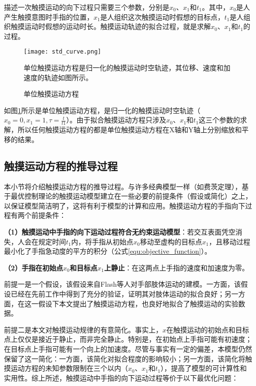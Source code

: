 描述一次触摸运动的向下过程只需要三个参数，分别是$x_0$、$x_1$和$t_1$。其中，$x_0$是人产生触摸意图时手指的位置，$x_1$是人组织这次触摸运动时假想的目标点，$t_1$是人组织触摸运动时假想的运动时长。触摸运动轨迹的拟合过程，就是求解$x_0$、$x_1$和$t_1$的过程。

\begin{figure}
	\centering
	\texttt{[image: std\_curve.png]}
	\caption*{单位触摸运动方程是归一化的触摸运动时空轨迹，其位移、速度和加速度的轨迹如图所示。}
	\caption{单位触摸运动方程}
	\label{fig:std_curve}
\end{figure}

如图\ref{fig:std_curve}所示是单位触摸运动方程，是归一化的触摸运动时空轨迹（$x_0=0,x_1=1,\tau=\frac{t}{t1}$）。由于拟合触摸运动方程只涉及$x_0$、$x_1$和$t_1$这三个参数的求解，所以任何触摸运动方程的都是单位触摸运动方程在X轴和Y轴上分别缩放和平移的结果。

\subsection{触摸运动方程的推导过程}

本小节将介绍触摸运动方程的推导过程。与许多经典模型一样（如费茨定理\cite{fitts1954information}），基于最优控制理论的触摸运动模型建立在一些必要的前提条件（假设或简化）之上，以保证模型简洁明了，这将有利于模型的计算和应用。触摸运动方程的手指向下过程有两个前提条件：

\textbf{（1）触摸运动中手指的向下运动过程符合无约束运动模型}：若交互表面凭空消失，人会在规定时间$t_1$内，将手指从初始点$x_0$移动至虚构的目标点$x_1$，且移动过程最小化了手指急动度的平方的积分（公式\ref{equ:objective_function}）。

\textbf{（2）手指在初始点$x_0$和目标点$x_1$上静止}：在这两点上手指的速度和加速度为零。

前提一是一个假设，该假设来自Flash等人对手部肢体运动的建模\cite{flash1985coordination}。一方面，该假设已经在先前工作中得到了充分的验证，证明其对肢体运动的拟合良好；另一方面，在这一假设下本文提出了触摸运动方程，也良好地拟合了触摸运动的实验数据。

前提二是本文对触摸运动规律的有意简化。事实上，$x$在触摸运动的初始点和目标点上仅仅是接近于静止，而非完全静止。特别是，在初始点上手指可能有初速度；在目标点上手指可能有一个向上的加速度。尽管与事实有一定的偏差，本模型仍然保留了这一简化：一方面，该简化对拟合程度的影响较小；另一方面，该简化将触摸运动方程的未知参数限制在三个以内（$x_0$、$x_1$和$t_1$），提高了模型的可计算性和实用性。综上所述，触摸运动中手指的向下运动过程等价于以下最优化问题：

